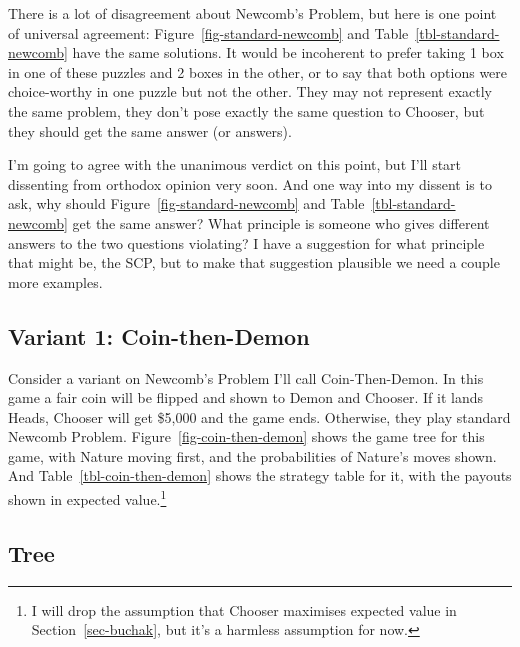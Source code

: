 \documentclass[
  10pt,
  letterpaper,
  DIV=11,
  numbers=noendperiod,
  twoside]{scrartcl}
\begin{document}
There is a lot of disagreement about Newcomb's Problem, but here is one
point of universal agreement: Figure~\ref{fig-standard-newcomb} and
Table~\ref{tbl-standard-newcomb} have the same solutions. It would be
incoherent to prefer taking 1 box in one of these puzzles and 2 boxes in
the other, or to say that both options were choice-worthy in one puzzle
but not the other. They may not represent exactly the same problem, they
don't pose exactly the same question to Chooser, but they should get the
same answer (or answers).

I'm going to agree with the unanimous verdict on this point, but I'll
start dissenting from orthodox opinion very soon. And one way into my
dissent is to ask, why should Figure~\ref{fig-standard-newcomb} and
Table~\ref{tbl-standard-newcomb} get the same answer? What principle is
someone who gives different answers to the two questions violating? I
have a suggestion for what principle that might be, the SCP, but to make
that suggestion plausible we need a couple more examples.

\subsection{Variant 1: Coin-then-Demon}\label{variant-1-coin-then-demon}

Consider a variant on Newcomb's Problem I'll call Coin-Then-Demon. In
this game a fair coin will be flipped and shown to Demon and Chooser. If
it lands Heads, Chooser will get \$5,000 and the game ends. Otherwise,
they play standard Newcomb Problem. Figure~\ref{fig-coin-then-demon}
shows the game tree for this game, with Nature moving first, and the
probabilities of Nature's moves shown. And
Table~\ref{tbl-coin-then-demon} shows the strategy table for it, with
the payouts shown in expected value.\footnote{I will drop the assumption
  that Chooser maximises expected value in Section~\ref{sec-buchak}, but
  it's a harmless assumption for now.}

\subsection{Tree}
\end{document}
